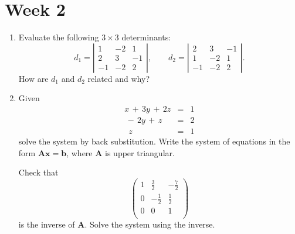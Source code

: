 \documentclass[11pt,a4paper]{article}
\def\bA{\mathbf{A}}
\def\bb{\mathbf{b}}
\def\bx{\mathbf{x}}
\begin{document}



\section*{Week 2}



\begin{enumerate}
\item
Evaluate the following  $3\times 3$ determinants:
$$  d_1 = \left| \begin{array}{rrr} 1&-2&1 \\ 2 & 3 & -1\\-1&-2&2 \end{array} \right|, \qquad
d_2=  \left| \begin{array}{rrr}2 & 3 & -1\\  1&-2&1 \\ -1&-2&2 \end{array} \right|. $$ 
How are  $d_1$ and $d_2$  related and why?

\item
Given 
\begin{eqnarray*}
x\,+\,3y\,+\,2z&=&1\\
\,-\,2y\,+\,z&=&2\\
\,\,\,z&=&1
\end{eqnarray*}
solve the system by back substitution. Write the  system of equations in the form $\bA\bx=\bb$, where $\bA$ is upper triangular.

Check that 
\[
\left(
\begin{array}{ccc}
1 & \frac{3}{2} &
-\frac{7}{2} \\
0 & -\frac{1}{2} &
\frac{1}{2} \\
0 & 0 & 1 \\
\end{array}
\right)
\]
is the inverse of $\bA$. Solve the system using the inverse.

\end{enumerate}
\end{document}
